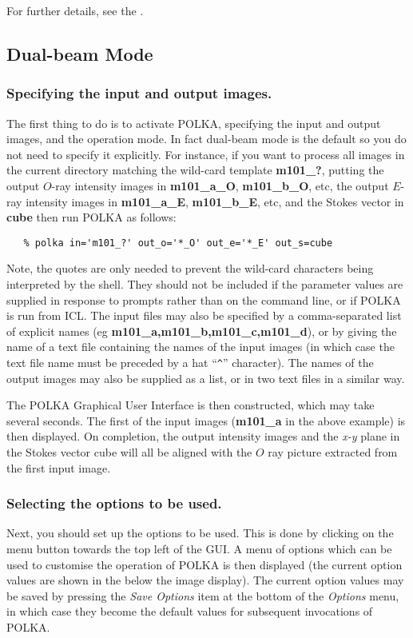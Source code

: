 For further details, see the .

\subsection {Dual-beam Mode}

\subsubsection {Specifying the input and output images.}
The first thing to do is to activate POLKA, specifying the input and
output images, and the operation mode. In fact dual-beam mode is the
default so you do not need to specify it explicitly. For instance, if you
want to process all images in the current directory matching the wild-card 
template {\bf m101\_?}, putting the output $O$-ray intensity images
in {\bf m101\_a\_O}, {\bf m101\_b\_O}, etc, the output $E$-ray intensity
images in {\bf m101\_a\_E}, {\bf m101\_b\_E}, etc, and the Stokes vector
in {\bf cube} then run POLKA as follows:

\begin{verbatim}
   % polka in='m101_?' out_o='*_O' out_e='*_E' out_s=cube
\end{verbatim}

Note, the quotes are only needed to prevent the wild-card characters
being interpreted by the shell. They should not be included if the
parameter values are supplied in response to prompts rather than on the
command line, or if POLKA is run from ICL. The input files may also be
specified by a comma-separated list of explicit names (eg {\bf
m101\_a,m101\_b,m101\_c,m101\_d}), or by giving the name of a text file
containing the names of the input images (in which case the text file
name must be preceded by a hat ``\verb+^+'' character). The names of the
output images may also be supplied as a list, or in two text files in a 
similar way.

The POLKA Graphical User Interface is then constructed, which may take
several seconds. The first of the input images ({\bf m101\_a} in the
above example) is then displayed. On completion, the output intensity
images and the {\em x-y} plane in the Stokes vector cube will all be
aligned with the $O$ ray picture extracted from the first input image.

\subsubsection {Selecting the options to be used.}
Next, you should set up the options to be used. This is done by clicking
on the  menu button towards
the top left of the GUI. A menu of options which can be used to customise
the operation of POLKA is then displayed (the current option values are 
shown in the  below the image 
display). The current option values may be saved by pressing the {\em
Save Options} item at the bottom of the {\em Options} menu, in which case
they become the default values for subsequent invocations of POLKA.

